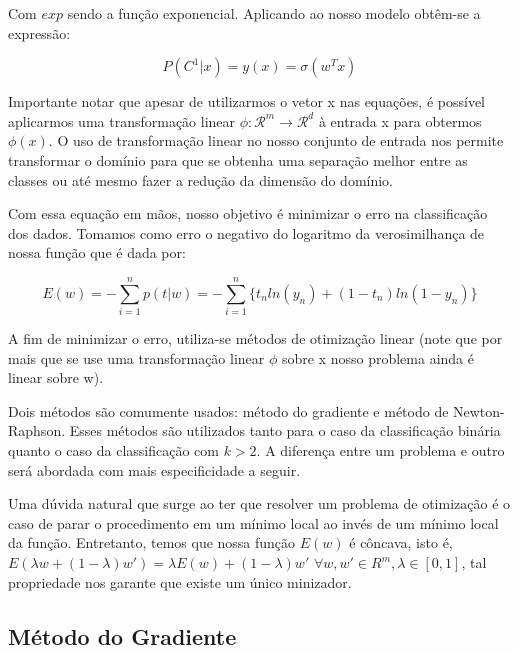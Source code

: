 Com $exp$ sendo a função exponencial. Aplicando ao nosso modelo obtêm-se a expressão:

\begin{center}
	\begin{equation}
		P(C^1 | x) = y(x) = \sigma(w^Tx)
	\end{equation}
\end{center}

Importante notar que apesar de utilizarmos o vetor x nas equações, é possível aplicarmos uma
transformação linear $\phi : \mathcal{R}^m \rightarrow \mathcal{R}^d$ à entrada x para obtermos
$\phi(x)$. O uso de transformação linear no nosso conjunto de entrada nos permite transformar o 
domínio para que se obtenha uma separação melhor entre as classes ou até mesmo fazer a redução
da dimensão do domínio.

Com essa equação em mãos, nosso objetivo é minimizar o erro na classificação dos dados. Tomamos
como erro o negativo do logaritmo da verosimilhança de nossa função que é dada por:

\begin{center}
	\begin{equation}
		E(w) = - \sum_{i = 1}^{n} p(t | w) = 
		- \sum_{i = 1}^{n} \{ t_nln(y_n) + (1 - t_n) ln(1 - y_n) \}
	\end{equation}
\end{center}

A fim de minimizar o erro, utiliza-se métodos de otimização linear (note que por mais que se use uma
transformação linear $\phi$ sobre x nosso problema ainda é linear sobre w).

Dois métodos são comumente	usados: método do gradiente e método de Newton-Raphson.
Esses métodos são utilizados tanto para o caso da classificação binária
quanto o caso da classificação com $k > 2$. A diferença entre um problema e outro será abordada
com mais especificidade a seguir.

Uma dúvida natural que surge ao ter que resolver um problema de otimização é o caso de parar o
procedimento em um mínimo local ao invés de um mínimo local da função.	Entretanto, temos que nossa
função $E(w)$ é côncava, isto é, $E(\lambda w + (1 - \lambda ) w') = \lambda E(w) 
	+ (1 - \lambda ) w'$
 $\forall w, w' \in R^m, \lambda \in [0, 1]$, tal propriedade nos garante que existe um único minizador.
 

\subsection{Método do Gradiente}\label{subsec:grad_descent}

